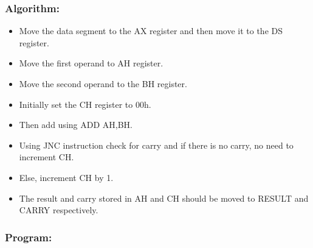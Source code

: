 \documentclass[12pt,a4paper]{article}
\begin{document}
\begin{flushleft}
\subsubsection*{\textbf{Algorithm:}}
\begin{itemize}
    \item Move the data segment to the AX register and then move it to the DS register.
    \item Move the first operand to AH register. 
    \item Move the second operand to the BH register. 
    \item Initially set the CH register to 00h. 
    \item Then add using ADD AH,BH.
    \item Using JNC instruction check for carry and if there is no carry, no need to increment CH.
    \item Else, increment CH by 1. 
    \item The result and carry stored in AH and CH should be moved to RESULT
and CARRY respectively.
\end{itemize}

\subsubsection*{\textbf{Program:}}


\end{flushleft}
\end{document}
